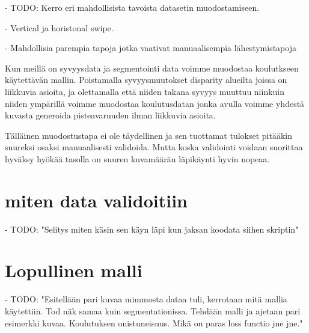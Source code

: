 - TODO: Kerro eri mahdollisista tavoista datasetin muodostamiseen.

- Vertical ja horistonal swipe. 

- Mahdollisia parempia tapoja jotka vaativat manuaalisempia lähestymistapoja



Kun meillä on syvyysdata ja segmentointi data voimme muodostaa koulutkseen käytettävän mallin. Poistamalla syvyysmuutokset disparity alueilta joissa on liikkuvia asioita, ja olettamalla että niiden takana syvyys muuttuu niinkuin niiden ympärillä voimme muodostaa koulutusdatan jonka avulla voimme yhdestä kuvasta generoida pisteavaruuden ilman liikkuvia asioita.

Tälläinen muodostustapa ei ole täydellinen ja sen tuottamat tulokset pitääkin suureksi osaksi manuaalisesti validoida. Mutta koska validointi voidaan suorittaa hyväksy hyökää tasolla on suuren kuvamäärän läpikäynti hyvin nopeaa.

\section{miten data validoitiin}

- TODO: "Selitys miten käsin sen käyn läpi kun jaksan koodata siihen skriptin"

\section{Lopullinen malli}

- TODO: "Esitellään pari kuvaa mimmosta dataa tuli, kerrotaan mitä mallia käytettiin. Tod näk samaa kuin segmentationissa. Tehdään malli ja ajetaan pari esimerkki kuvaa. Koulutuksen onistuneisuus. Mikä on paras loss functio jne jne."



